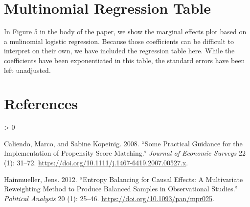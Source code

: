 \documentclass[
  12pt,
]{article}
\newlength{\cslhangindent}
\newenvironment{CSLReferences}[2] %
 {%
  \setlength{\parindent}{0pt}
  \ifodd #1 \everypar{\setlength{\hangindent}{\cslhangindent}}\ignorespaces\fi
  \ifnum #2 > 0
  \setlength{\parskip}{#2\baselineskip}
  \fi
 }%
 {}
\begin{document}
\hypertarget{multinomial-regression-table}{%
\section*{Multinomial Regression Table}\label{multinomial-regression-table}}

In Figure 5 in the body of the paper, we show the marginal effects plot based on a mulinomial logistic regression. Because those coefficients can be difficult to interpret on their own, we have included the regression table here. While the coefficients have been exponentiated in this table, the standard errors have been left unadjusted.

\begin{singlespace}

\end{singlespace}

\hypertarget{references}{%
\section*{References}\label{references}}

\hypertarget{refs}{}
\begin{CSLReferences}{1}{0}
\leavevmode\hypertarget{ref-Caliendo2008}{}%
Caliendo, Marco, and Sabine Kopeinig. 2008. {``Some {Practical Guidance} for the {Implementation} of {Propensity Score Matching}.''} \emph{Journal of Economic Surveys} 22 (1): 31--72. \url{https://doi.org/10.1111/j.1467-6419.2007.00527.x}.

\leavevmode\hypertarget{ref-Hainmueller2012}{}%
Hainmueller, Jens. 2012. {``Entropy {Balancing} for {Causal Effects}: {A Multivariate Reweighting Method} to {Produce Balanced Samples} in {Observational Studies}.''} \emph{Political Analysis} 20 (1): 25--46. \url{https://doi.org/10.1093/pan/mpr025}.

\end{CSLReferences}
\end{document}
